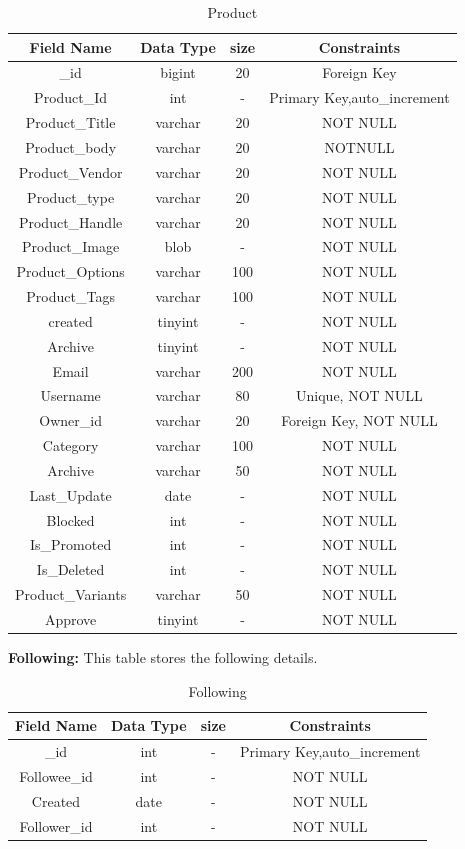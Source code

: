\begin{table}[hp]
\centering
\begin{tabular}{|c|c|c|c|}
\hline
\textbf{Field Name}  & \textbf{Data Type}  & \textbf{size} &\textbf{Constraints}  \\
\hline
\_id & bigint &	20 & Foreign Key\\
\hline
Product\_Id & int & - & Primary Key,auto\_increment\\
\hline
Product\_Title &	varchar & 20 & NOT NULL \\
\hline
Product\_body &	varchar & 20  & NOTNULL \\
\hline
Product\_Vendor & varchar & 20 & NOT NULL\\
\hline
Product\_type &	varchar & 20 & NOT NULL\\
\hline
Product\_Handle &	varchar & 20 & NOT NULL\\
\hline
Product\_Image &	blob & - & NOT NULL\\
\hline
Product\_Options &	varchar & 100 & NOT NULL\\
\hline
Product\_Tags &	varchar & 100 & NOT NULL\\
\hline
created & tinyint & - & NOT NULL\\
\hline
Archive & tinyint & - & NOT NULL\\
\hline
Email &	varchar & 200 & NOT NULL\\
\hline
Username &	varchar & 80 & Unique, NOT NULL\\
\hline
Owner\_id &	varchar & 20 & Foreign Key, NOT NULL\\
\hline
Category &	varchar & 100 & NOT NULL\\
\hline
Archive &	varchar & 50 & NOT NULL\\
\hline
Last\_Update &	date & - & NOT NULL\\
\hline
Blocked &	int & - & NOT NULL\\
\hline
Is\_Promoted & int & - & NOT NULL\\
\hline
Is\_Deleted & int & - & NOT NULL\\
\hline
Product\_Variants &	varchar & 50 & NOT NULL\\
\hline
Approve &	tinyint & - & NOT NULL\\
\hline
\end{tabular}
\caption{Product}
\end{table}

\textbf{Following:} This table stores the following details.\nolinebreak
\begin{table}[hp]
\centering
\begin{tabular}{|c|c|c|c|}
\hline
\textbf{Field Name}  & \textbf{Data Type}  & \textbf{size} &\textbf{Constraints}  \\
\hline
\_id &	int & - &  Primary Key,auto\_increment \\\hline
Followee\_id &	int & - & NOT NULL \\\hline
Created & date &	- & NOT NULL \\\hline
Follower\_id & int &	- & NOT NULL \\\hline

\end{tabular}
\caption{Following}
\end{table}

